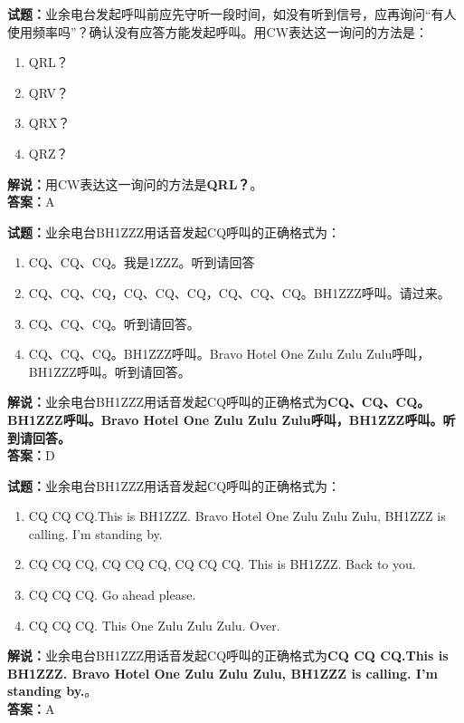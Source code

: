\documentclass{ctexbook}
\begin{document}
\vspace{\baselineskip}

\noindent\textbf{试题：}业余电台发起呼叫前应先守听一段时间，如没有听到信号，应再询问“有人使用频率吗”？确认没有应答方能发起呼叫。用CW表达这一询问的方法是：
\begin{enumerate}[leftmargin=3em]
  \item QRL？
  \item QRV？
  \item QRX？
  \item QRZ？
\end{enumerate}
\noindent\textbf{解说：}用CW表达这一询问的方法是\textbf{QRL？}。\\\noindent\textbf{答案：}A

\vspace{\baselineskip}

\noindent\textbf{试题：}业余电台BH1ZZZ用话音发起CQ呼叫的正确格式为：
\begin{enumerate}[leftmargin=3em]
  \item CQ、CQ、CQ。我是1ZZZ。听到请回答
  \item CQ、CQ、CQ，CQ、CQ、CQ，CQ、CQ、CQ。BH1ZZZ呼叫。请过来。
  \item CQ、CQ、CQ。听到请回答。
  \item CQ、CQ、CQ。BH1ZZZ呼叫。Bravo Hotel One Zulu Zulu Zulu呼叫，BH1ZZZ呼叫。听到请回答。
\end{enumerate}
\noindent\textbf{解说：}业余电台BH1ZZZ用话音发起CQ呼叫的正确格式为\textbf{CQ、CQ、CQ。BH1ZZZ呼叫。Bravo Hotel One Zulu Zulu Zulu呼叫，BH1ZZZ呼叫。听到请回答。}\\\noindent\textbf{答案：}D

\vspace{\baselineskip}

\noindent\textbf{试题：}业余电台BH1ZZZ用话音发起CQ呼叫的正确格式为：
\begin{enumerate}[leftmargin=3em]
  \item CQ CQ CQ.This is BH1ZZZ. Bravo Hotel One Zulu Zulu Zulu, BH1ZZZ is calling. I’m standing by.
  \item CQ CQ CQ, CQ CQ CQ, CQ CQ CQ. This is BH1ZZZ. Back to you.
  \item CQ CQ CQ. Go ahead please.
  \item CQ CQ CQ. This One Zulu Zulu Zulu. Over.
\end{enumerate}
\noindent\textbf{解说：}业余电台BH1ZZZ用话音发起CQ呼叫的正确格式为\textbf{CQ CQ CQ.This is BH1ZZZ. Bravo Hotel One Zulu Zulu Zulu, BH1ZZZ is calling. I’m standing by.}。\\\noindent\textbf{答案：}A
\end{document}

